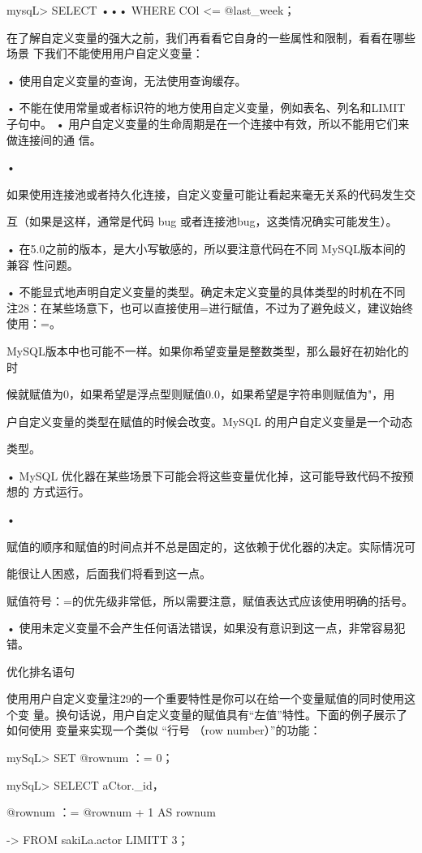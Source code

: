 mysqL> SELECT ••• WHERE COl <= @last\_week；

在了解自定义变量的强大之前，我们再看看它自身的一些属性和限制，看看在哪些场景
下我们不能使用用户自定义变量：

• 使用自定义变量的查询，无法使用查询缓存。

• 不能在使用常量或者标识符的地方使用自定义变量，例如表名、列名和LIMIT 子句中。
• 用户自定义变量的生命周期是在一个连接中有效，所以不能用它们来做连接间的通
信。

•

如果使用连接池或者持久化连接，自定义变量可能让看起来毫无关系的代码发生交

互（如果是这样，通常是代码 bug 或者连接池bug，这类情况确实可能发生）。

• 在5.0之前的版本，是大小写敏感的，所以要注意代码在不同 MySQL版本间的兼容
性问题。

• 不能显式地声明自定义变量的类型。确定未定义变量的具体类型的时机在不同
注28：在某些场意下，也可以直接使用=进行賦值，不过为了避免歧义，建议始终使用：=。

MySQL版本中也可能不一样。如果你希望变量是整数类型，那么最好在初始化的时

候就赋值为0，如果希望是浮点型则赋值0.0，如果希望是字符串则赋值为"，用

户自定义变量的类型在赋值的时候会改变。MySQL 的用户自定义变量是一个动态

类型。

• MySQL 优化器在某些场景下可能会将这些变量优化掉，这可能导致代码不按预想的
方式运行。

•

赋值的顺序和赋值的时间点并不总是固定的，这依赖于优化器的决定。实际情况可

能很让人困惑，后面我们将看到这一点。

赋值符号：=的优先级非常低，所以需要注意，赋值表达式应该使用明确的括号。

• 使用未定义变量不会产生任何语法错误，如果没有意识到这一点，非常容易犯错。

优化排名语句

使用用户自定义变量注29的一个重要特性是你可以在给一个变量赋值的同时使用这个变
量。换句话说，用户自定义变量的赋值具有“左值”特性。下面的例子展示了如何使用
变量来实现一个类似 “行号 （row number）”的功能：

mySqL> SET @rownum ：= 0；

mySqL> SELECT aCtor.\_id，

@rownum ：= @rownum + 1 AS rownum

-> FROM sakiLa.actor LIMITT 3；

